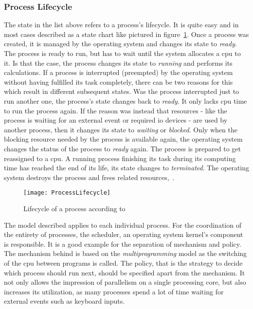 \subsubsection*{Process Lifecycle}
The state in the list above refers to a process's lifecycle.
It is quite easy and in most cases described as a state chart like pictured in figure~\ref{pic:process-lifecycle}.
Once a process was created, it is managed by the operating system and changes its state to \textit{ready}.
The process is ready to run, but has to wait until the system allocates a \ac{cpu} to it.
Is that the case, the process changes its state to \textit{running} and performs its calculations.
If a process is interrupted (preempted) by the operating system without having fulfilled its task completely, there can be two reasons for this which result in different subsequent states.
Was the process interrupted just to run another one, the process's state changes back to \textit{ready}. 
It only lacks \ac{cpu} time to run the process again.
If the reason was instead that resources - like the process is waiting for an external event or required \ac{io} devices - are used by another process, then it changes its state to \textit{waiting} or \textit{blocked}. 
Only when the blocking resource needed by the process is available again, the operating system changes the status of the process to \textit{ready} again.
The process is prepared to get reassigned to a \ac{cpu}.
A running process finishing its task during its computing time has reached the end of its life, its state changes to \textit{terminated}.
The operating system destroys the process and frees related resources\cite{silberschatz2009operating},~\cite{mandl2014Grundkurs}.

\begin{figure} [t]
	\centering
	\texttt{[image: ProcessLifecycle]}
    \caption{Lifecycle of a process according to~\label{pic:process-lifecycle}\cite{silberschatz2009operating}}
\end{figure}

The model described applies to each individual process.
For the coordination of the entirety of processes, the scheduler, an operating system kernel's component is responsible.
It is a good example for the separation of mechanism and policy.
The mechanism behind is based on the \textit{multiprogramming} model as the switching of the \ac{cpu} between programs is called.
The policy, that is the strategy to decide which process should run next, should be specified apart from the mechanism. 
It not only allows the impression of parallelism on a single processing core, but also increases its utilization, as many processes spend a lot of time waiting for external events such as keyboard inputs\cite{tanenbaum-modern-operating-systems}.

